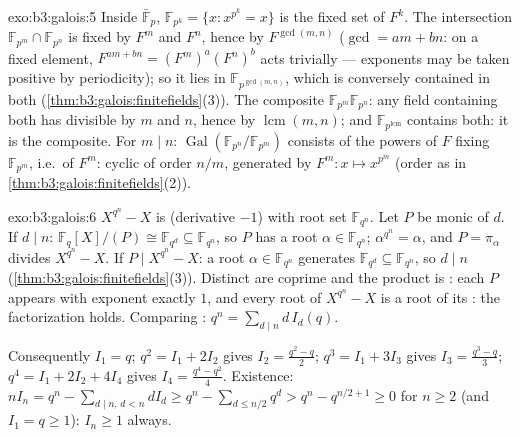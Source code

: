 \begin{solution}{exo:b3:galois:5}
Inside $\bar{\mathbb F}_p$, $\mathbb F_{p^k} = \{x : x^{p^k} =
x\}$ is the fixed set of $F^k$. The intersection $\mathbb F_{p^m}
\cap \mathbb F_{p^n}$ is fixed by $F^m$ and $F^n$, hence by
$F^{\gcd(m,n)}$ ($\gcd = am + bn$: on a fixed element, $F^{am +
bn} = (F^m)^a(F^n)^b$ acts trivially --- exponents may be taken
positive by periodicity); so it lies in $\mathbb
F_{p^{\gcd(m,n)}}$, which is conversely contained in both
(\cref{thm:b3:galois:finitefields}(3)). The composite $\mathbb
F_{p^m}\mathbb F_{p^n}$: any field containing both has 
divisible by $m$ and $n$, hence by $\operatorname{lcm}(m,n)$; and
$\mathbb F_{p^{\operatorname{lcm}}}$ contains both: it is the
composite. For $m \mid n$: $\operatorname{Gal}(\mathbb
F_{p^n}/\mathbb F_{p^m})$ consists of the powers of $F$ fixing
$\mathbb F_{p^m}$, i.e.\ of $F^m$: cyclic of order $n/m$,
generated by $F^m \colon x \mapsto x^{p^m}$ (order as in
\cref{thm:b3:galois:finitefields}(2)).
\end{solution}

\begin{solution}{exo:b3:galois:6}
$X^{q^n} - X$ is  (derivative $-1$) with root set
$\mathbb F_{q^n}$. Let $P$ be monic  of  $d$.
If $d \mid n$: $\mathbb F_q[X]/(P) \cong \mathbb F_{q^d}
\subseteq \mathbb F_{q^n}$, so $P$ has a root $\alpha \in
\mathbb F_{q^n}$; $\alpha^{q^n} = \alpha$, and $P =
\pi_\alpha$ divides $X^{q^n} - X$. If $P \mid X^{q^n} - X$: a
root $\alpha \in \mathbb F_{q^n}$ generates $\mathbb F_{q^d}
\subseteq \mathbb F_{q^n}$, so $d \mid n$
(\cref{thm:b3:galois:finitefields}(3)). Distinct 
are coprime and the product is : each $P$ appears with
exponent exactly $1$, and every root of $X^{q^n}-X$ is a root
of its : the factorization holds. Comparing
: $q^n = \sum_{d\mid n} d\,I_d(q)$.

Consequently $I_1 = q$; $q^2 = I_1 + 2I_2$ gives $I_2 =
\frac{q^2 - q}2$; $q^3 = I_1 + 3I_3$ gives $I_3 = \frac{q^3 -
q}3$; $q^4 = I_1 + 2I_2 + 4I_4$ gives $I_4 = \frac{q^4 -
q^2}4$. Existence: $nI_n = q^n - \sum_{d \mid n,\, d < n}
dI_d \geq q^n - \sum_{d \leq n/2} q^d > q^n - q^{n/2 + 1} \geq
0$ for $n \geq 2$ (and $I_1 = q \geq 1$): $I_n \geq 1$ always.
\end{solution}

